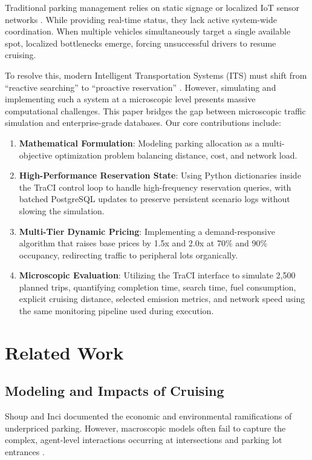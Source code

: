 \documentclass[conference]{IEEEtran}
\begin{document}
Traditional parking management relies on static signage or localized IoT sensor networks \cite{b3}. While providing real-time status, they lack active system-wide coordination. When multiple vehicles simultaneously target a single available spot, localized bottlenecks emerge, forcing unsuccessful drivers to resume cruising.

To resolve this, modern Intelligent Transportation Systems (ITS) must shift from ``reactive searching'' to ``proactive reservation'' \cite{b4}. However, simulating and implementing such a system at a microscopic level presents massive computational challenges. This paper bridges the gap between microscopic traffic simulation and enterprise-grade databases. Our core contributions include:

\begin{enumerate}
    \item \textbf{Mathematical Formulation}: Modeling parking allocation as a multi-objective optimization problem balancing distance, cost, and network load.
    \item \textbf{High-Performance Reservation State}: Using Python dictionaries inside the TraCI control loop to handle high-frequency reservation queries, with batched PostgreSQL updates to preserve persistent scenario logs without slowing the simulation.
    \item \textbf{Multi-Tier Dynamic Pricing}: Implementing a demand-responsive algorithm that raises base prices by 1.5x and 2.0x at 70\% and 90\% occupancy, redirecting traffic to peripheral lots organically.
    \item \textbf{Microscopic Evaluation}: Utilizing the TraCI interface to simulate 2,500 planned trips, quantifying completion time, search time, fuel consumption, explicit cruising distance, selected emission metrics, and network speed using the same monitoring pipeline used during execution.
\end{enumerate}

\section{Related Work}

\subsection{Modeling and Impacts of Cruising}
Shoup \cite{b1} and Inci \cite{b2} documented the economic and environmental ramifications of underpriced parking. However, macroscopic models often fail to capture the complex, agent-level interactions occurring at intersections and parking lot entrances \cite{b5}.
\end{document}
